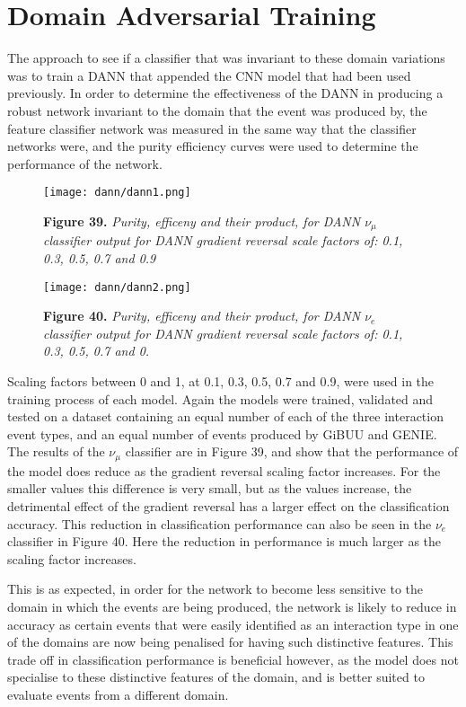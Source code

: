 \newpage
\section{Domain Adversarial Training}

\noindent The approach to see if a classifier that was invariant to these domain variations was to train a DANN that appended the CNN model that had been used previously. In order to determine the effectiveness of the DANN in producing a robust network invariant to the domain that the event was produced by, the feature classifier network was measured in the same way that the classifier networks were, and the purity efficiency curves were used to  determine the performance of the network.\medskip

\begin{figure}[t!]
 \centering
 \texttt{[image: dann/dann1.png]}
 
 \textbf{Figure 39.} \textit{Purity, efficeny and their product, for DANN $\nu_\mu$ classifier output for DANN gradient reversal scale factors of: 0.1, 0.3, 0.5, 0.7 and 0.9}

 \texttt{[image: dann/dann2.png]}
 
 \textbf{Figure 40.} \textit{Purity, efficeny and their product, for DANN $\nu_e$ classifier output for DANN gradient reversal scale factors of: 0.1, 0.3, 0.5, 0.7 and 0.}
\end{figure}

\noindent Scaling factors between 0 and 1, at 0.1, 0.3, 0.5, 0.7 and 0.9, were used in the training process of each model. Again the models were trained, validated and tested on a dataset containing an equal number of each of the three interaction event types, and an equal number of events produced by GiBUU and GENIE. The results of the $\nu_\mu$ classifier are in Figure 39, and show that the performance of the model does reduce as the gradient reversal scaling factor increases. For the smaller values this difference is very small, but as the values increase, the detrimental effect of the gradient reversal has a larger effect on the classification accuracy. This reduction in classification performance can also be seen in the $\nu_e$ classifier in Figure 40. Here the reduction in performance is much larger as the scaling factor increases. \medskip

\noindent This is as expected, in order for the network to become less sensitive to the domain in which the events are being produced, the network is likely to reduce in accuracy as certain events that were easily identified as an interaction type in one of the domains are now being penalised for having such distinctive features. This trade off in classification performance is beneficial however, as the model does not specialise to these distinctive features of the domain, and is better suited to evaluate events from a different domain.\medskip


